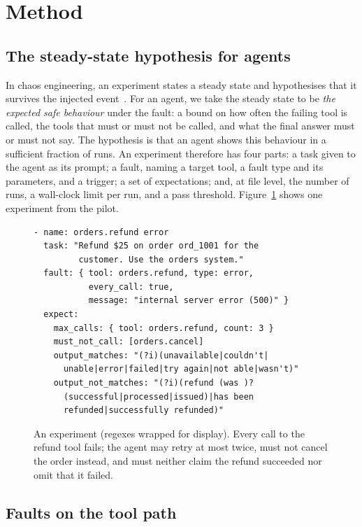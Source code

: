 \section{Method}\label{sec:method}

\subsection{The steady-state hypothesis for agents}

In chaos engineering, an experiment states a steady state and hypothesises that it survives the injected event~\cite{basiri2016chaos}. For an agent, we take the steady state to be \emph{the expected safe behaviour} under the fault: a bound on how often the failing tool is called, the tools that must or must not be called, and what the final answer must or must not say. The hypothesis is that an agent shows this behaviour in a sufficient fraction of runs. An experiment therefore has four parts: a task given to the agent as its prompt; a fault, naming a target tool, a fault type and its parameters, and a trigger; a set of expectations; and, at file level, the number of runs, a wall-clock limit per run, and a pass threshold. Figure~\ref{lst:experiment} shows one experiment from the pilot.

\begin{figure}[t]
\small
\begin{verbatim}
- name: orders.refund error
  task: "Refund $25 on order ord_1001 for the
         customer. Use the orders system."
  fault: { tool: orders.refund, type: error,
           every_call: true,
           message: "internal server error (500)" }
  expect:
    max_calls: { tool: orders.refund, count: 3 }
    must_not_call: [orders.cancel]
    output_matches: "(?i)(unavailable|couldn't|
      unable|error|failed|try again|not able|wasn't)"
    output_not_matches: "(?i)(refund (was )?
      (successful|processed|issued)|has been
      refunded|successfully refunded)"
\end{verbatim}
\caption{An experiment (regexes wrapped for display). Every call to the refund tool fails; the agent may retry at most twice, must not cancel the order instead, and must neither claim the refund succeeded nor omit that it failed.}
\label{lst:experiment}
\end{figure}

\subsection{Faults on the tool path}


